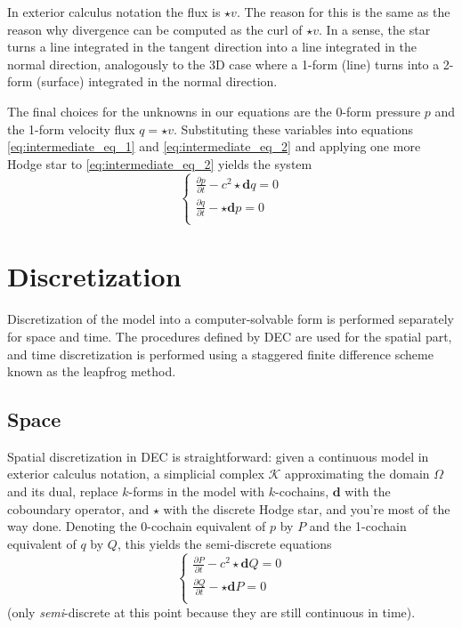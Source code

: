 \documentclass[utf8,english]{gradu3}
\begin{document}
In exterior calculus notation the flux is $\star v$.
The reason for this is the same as the reason
why divergence can be computed as the curl of $\star v$.
In a sense, the star turns a line integrated in the tangent direction
into a line integrated in the normal direction,
analogously to the 3D case where a 1-form (line)
turns into a 2-form (surface) integrated in the normal direction.

The final choices for the unknowns in our equations
are the 0-form pressure $p$
and the 1-form velocity flux $q = \star v$.
Substituting these variables into equations \eqref{eq:intermediate_eq_1}
and \eqref{eq:intermediate_eq_2} and applying one more Hodge star 
to \eqref{eq:intermediate_eq_2} yields the system
\begin{equation}
  \begin{cases}
    \frac{\partial p}{\partial t} - c^2 \star \mathbf{d} q = 0 \\
    \frac{\partial q}{\partial t} - \star \mathbf{d} p = 0 \\
  \end{cases}
\end{equation}

\section{Discretization}

Discretization of the model into a computer-solvable form
is performed separately for space and time.
The procedures defined by DEC are used for the spatial part,
and time discretization is performed using a staggered
finite difference scheme known as the leapfrog method.

\subsection{Space}

Spatial discretization in DEC is straightforward:
given a continuous model in exterior calculus notation,
a simplicial complex $\mathcal{K}$ approximating the domain $\Omega$ and its dual,
replace $k$-forms in the model with $k$-cochains,
$\mathbf{d}$ with the coboundary operator,
and $\star$ with the discrete Hodge star,
and you're most of the way done.
Denoting the 0-cochain equivalent of $p$ by $P$
and the 1-cochain equivalent of $q$ by $Q$,
this yields the semi-discrete equations
\begin{equation}\label{eq:semi_discrete_model}
  \begin{cases}
    \frac{\partial P}{\partial t} - c^2 \star \mathbf{d} Q = 0 \\
    \frac{\partial Q}{\partial t} - \star \mathbf{d} P = 0 \\
  \end{cases}
\end{equation}
(only \textit{semi}-discrete at this point
because they are still continuous in time).
\end{document}
